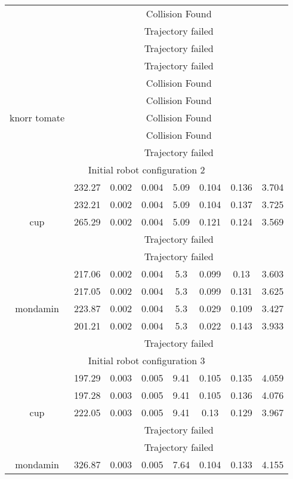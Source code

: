 {\begin{center}
\begin{longtable}[c]{ | c | c | c | c | c | c | c || c || }
& \multicolumn{7}{c|}{Collision Found} \\ 
& \multicolumn{7}{c|}{Trajectory failed} \\ 
& \multicolumn{7}{c|}{Trajectory failed} \\ 
& \multicolumn{7}{c|}{Trajectory failed} \\
\hline 
\multirow{5}{1.5cm}{knorr tomate}& \multicolumn{7}{c|}{Collision Found} \\ 
& \multicolumn{7}{c|}{Collision Found} \\ 
& \multicolumn{7}{c|}{Collision Found} \\ 
& \multicolumn{7}{c|}{Collision Found} \\ 
& \multicolumn{7}{c|}{Trajectory failed} \\ 
\hline 
\multicolumn{8}{|c|}{Initial robot configuration 2} \\
\hline
\multirow{5}{1.5cm}{cup}& 232.27 & 0.002 & 0.004 & 5.09 & 0.104 & 0.136 & 3.704 \\ 
& 232.21 & 0.002 & 0.004 & 5.09 & 0.104 & 0.137 & 3.725 \\ 
& 265.29 & 0.002 & 0.004 & 5.09 & 0.121 & 0.124 & 3.569 \\ 
& \multicolumn{7}{c|}{Trajectory failed} \\ 
& \multicolumn{7}{c|}{Trajectory failed} \\ 
\hline 
\multirow{5}{1.5cm}{mondamin}& 217.06 & 0.002 & 0.004 & 5.3 & 0.099 & 0.13 & 3.603 \\ 
& 217.05 & 0.002 & 0.004 & 5.3 & 0.099 & 0.131 & 3.625 \\ 
& 223.87 & 0.002 & 0.004 & 5.3 & 0.029 & 0.109 & 3.427 \\ 
& 201.21 & 0.002 & 0.004 & 5.3 & 0.022 & 0.143 & 3.933 \\ 
& \multicolumn{7}{c|}{Trajectory failed} \\ 
\hline 
\multicolumn{8}{|c|}{Initial robot configuration 3} \\
\hline
\multirow{5}{1.5cm}{cup}& 197.29 & 0.003 & 0.005 & 9.41 & 0.105 & 0.135 & 4.059 \\ 
& 197.28 & 0.003 & 0.005 & 9.41 & 0.105 & 0.136 & 4.076 \\ 
& 222.05 & 0.003 & 0.005 & 9.41 & 0.13 & 0.129 & 3.967 \\ 
& \multicolumn{7}{c|}{Trajectory failed} \\ 
& \multicolumn{7}{c|}{Trajectory failed} \\ 
\hline 
\multirow{5}{1.5cm}{mondamin}& 326.87 & 0.003 & 0.005 & 7.64 & 0.104 & 0.133 & 4.155 \\ 

\end{longtable}
\end{center}}
